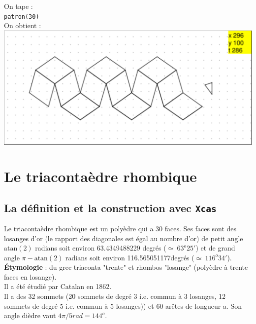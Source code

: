 \documentclass[a4paper,11pt]{book}
\newcommand{\atan}{\mbox{atan}}
\begin{document}
On tape :\\
{\tt patron(30)}\\
On obtient :\\
\includegraphics[width=\textwidth]{patrondodec}\\
\section{Le triaconta\`edre rhombique}
\subsection{La d\'efinition et la construction avec {\tt Xcas}}
Le triaconta\`edre  rhombique est un poly\`edre qui a 30 faces. Ses faces sont 
des losanges d'or (le rapport des diagonales est \'egal au nombre d'or) de 
petit angle $\atan(2)$ radians soit environ 63.4349488229 degr\'es 
($\simeq\ 63^o 25'$) et de grand angle $\pi-\atan(2)$ radians soit environ 
116.565051177degr\'es ($\simeq\ 116^o 34'$).\\
{\bf Étymologie} : du grec triaconta "trente" et  rhombos "losange" (polyèdre à trente faces en losange).\\
Il a \'et\'e \'etudi\'e par Catalan en 1862.\\
Il a des 32 sommets (20 sommets de degr\'e 3 i.e. commun \`a 3 losanges, 12 sommets de degr\'e 5 i.e. commun \`a 5 losanges)) et 60 ar\^etes de 
longueur a. Son angle dièdre vaut $4\pi/5 rad = 144^o$.
\end{document}
